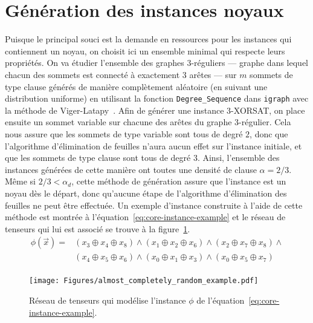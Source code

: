 \section{Génération des instances noyaux}\label{sec:core-instances}
Puisque le principal souci est la demande en ressources pour les instances qui contiennent un noyau, on choisit ici un ensemble minimal qui respecte leurs propriétés.
On va étudier l'ensemble des graphes $3$-réguliers --- graphe dans lequel chacun des sommets est connecté à exactement $3$ arêtes --- sur $m$ sommets de type clause générés de manière complètement aléatoire (en suivant une distribution uniforme) en utilisant la fonction \verb|Degree_Sequence| dans \verb|igraph| avec la méthode de Viger-Latapy~\cite{viger_efficient_2016}.
Afin de générer une instance $3$-XORSAT, on place ensuite un sommet variable sur chacune des arêtes du graphe $3$-régulier.
Cela nous assure que les sommets de type variable sont tous de degré $2$, donc que l'algorithme d'élimination de feuilles n'aura aucun effet sur l'instance initiale, et que les sommets de type clause sont tous de degré $3$.
Ainsi, l'ensemble des instances générées de cette manière ont toutes une densité de clause $\alpha = 2/3$.
Même si $2/3 < \alpha_d$, cette méthode de génération assure que l'instance est un noyau dès le départ, donc qu'aucune étape de l'algorithme d'élimination des feuilles ne peut être effectuée.
Un exemple d'instance construite à l'aide de cette méthode est montrée à l'équation~\ref{eq:core-instance-example} et le réseau de tenseurs qui lui est associé se trouve à la figure~\ref{fig:core-instance-example}.
\begin{equation}\label{eq:core-instance-example}
    \begin{split}
        \phi(\vec{x}) = &(x_3 \oplus x_4 \oplus x_8) \wedge (x_1 \oplus x_2 \oplus x_6) \wedge (x_2 \oplus x_7 \oplus x_8) \wedge\\
        &(x_4 \oplus x_5 \oplus x_6) \wedge (x_0 \oplus x_1 \oplus x_3) \wedge (x_0 \oplus x_5 \oplus x_7)\\
    \end{split}
  \end{equation}
\begin{figure}[h]
    \centering
    \texttt{[image: Figures/almost\_completely\_random\_example.pdf]}
    \caption{Réseau de tenseurs qui modélise l'instance $\phi$ de l'équation~\ref{eq:core-instance-example}.}
    \label{fig:core-instance-example}
\end{figure}
